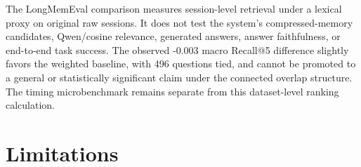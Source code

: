 \documentclass[review,12pt]{elsarticle}
\begin{document}
The LongMemEval comparison measures session-level retrieval under a lexical proxy on original raw sessions. It does not test the system's compressed-memory candidates, Qwen/cosine relevance, generated answers, answer faithfulness, or end-to-end task success. The observed -0.003 macro Recall@5 difference slightly favors the weighted baseline, with 496 questions tied, and cannot be promoted to a general or statistically significant claim under the connected overlap structure. The timing microbenchmark remains separate from this dataset-level ranking calculation.

\section{Limitations}
\label{sec:limitations}
\end{document}
